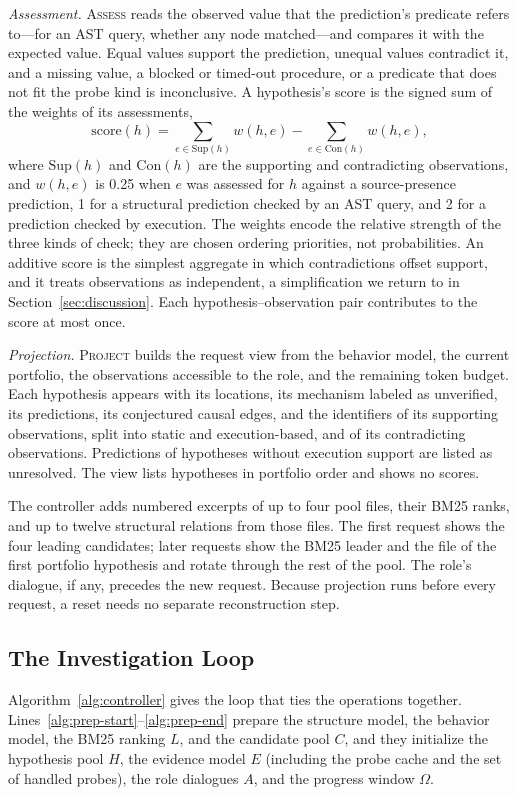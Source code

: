 \documentclass[letterpaper,journal]{IEEEtran}
\begin{document}
\emph{Assessment.} \textsc{Assess} reads the observed value that the prediction's predicate refers to---for an AST query, whether any node matched---and compares it with the expected value. Equal values support the prediction, unequal values contradict it, and a missing value, a blocked or timed-out procedure, or a predicate that does not fit the probe kind is inconclusive. A hypothesis's score is the signed sum of the weights of its assessments,
\begin{equation}\label{eq:score}
\mathrm{score}(h)=\sum_{e\in\mathrm{Sup}(h)} w(h,e)-\sum_{e\in\mathrm{Con}(h)} w(h,e),
\end{equation}
where $\mathrm{Sup}(h)$ and $\mathrm{Con}(h)$ are the supporting and contradicting observations, and $w(h,e)$ is 0.25 when $e$ was assessed for $h$ against a source-presence prediction, 1 for a structural prediction checked by an AST query, and 2 for a prediction checked by execution. The weights encode the relative strength of the three kinds of check; they are chosen ordering priorities, not probabilities. An additive score is the simplest aggregate in which contradictions offset support, and it treats observations as independent, a simplification we return to in Section~\ref{sec:discussion}. Each hypothesis--observation pair contributes to the score at most once.

\emph{Projection.} \textsc{Project} builds the request view from the behavior model, the current portfolio, the observations accessible to the role, and the remaining token budget. Each hypothesis appears with its locations, its mechanism labeled as unverified, its predictions, its conjectured causal edges, and the identifiers of its supporting observations, split into static and execution-based, and of its contradicting observations. Predictions of hypotheses without execution support are listed as unresolved. The view lists hypotheses in portfolio order and shows no scores.

The controller adds numbered excerpts of up to four pool files, their BM25 ranks, and up to twelve structural relations from those files. The first request shows the four leading candidates; later requests show the BM25 leader and the file of the first portfolio hypothesis and rotate through the rest of the pool. The role's dialogue, if any, precedes the new request. Because projection runs before every request, a reset needs no separate reconstruction step.

\subsection{The Investigation Loop}\label{sec:procedure}
Algorithm~\ref{alg:controller} gives the loop that ties the operations together. Lines~\ref{alg:prep-start}--\ref{alg:prep-end} prepare the structure model, the behavior model, the BM25 ranking $L$, and the candidate pool $C$, and they initialize the hypothesis pool $H$, the evidence model $E$ (including the probe cache and the set of handled probes), the role dialogues $A$, and the progress window $\Omega$.
\end{document}
